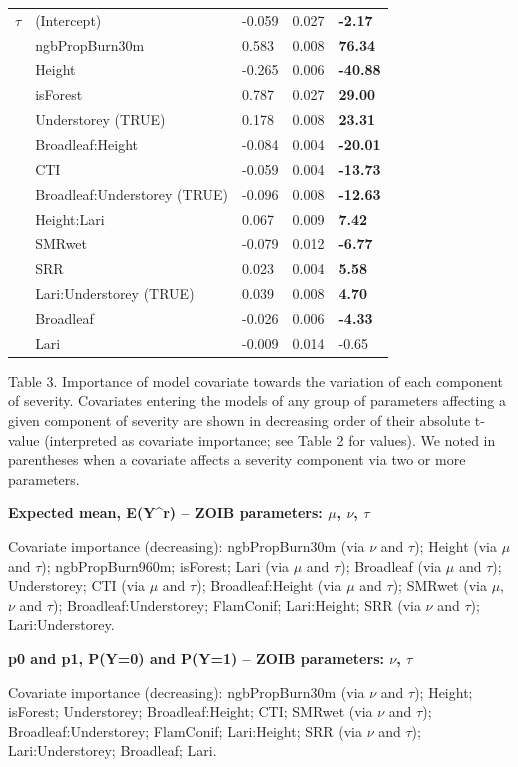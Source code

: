 \documentclass[
  numafflabel,
  authoryear,
  preprint]{elsarticle}
\begin{document}
\begin{longtable}[]{@{}lllll@{}}
\(\tau\) & (Intercept) & -0.059 & 0.027 & \textbf{-2.17} \\
& ngbPropBurn30m & 0.583 & 0.008 & \textbf{76.34} \\
& Height & -0.265 & 0.006 & \textbf{-40.88} \\
& isForest & 0.787 & 0.027 & \textbf{29.00} \\
& Understorey (TRUE) & 0.178 & 0.008 & \textbf{23.31} \\
& Broadleaf:Height & -0.084 & 0.004 & \textbf{-20.01} \\
& CTI & -0.059 & 0.004 & \textbf{-13.73} \\
& Broadleaf:Understorey (TRUE) & -0.096 & 0.008 & \textbf{-12.63} \\
& Height:Lari & 0.067 & 0.009 & \textbf{7.42} \\
& SMRwet & -0.079 & 0.012 & \textbf{-6.77} \\
& SRR & 0.023 & 0.004 & \textbf{5.58} \\
& Lari:Understorey (TRUE) & 0.039 & 0.008 & \textbf{4.70} \\
& Broadleaf & -0.026 & 0.006 & \textbf{-4.33} \\
& Lari & -0.009 & 0.014 & -0.65 \\
\end{longtable}

\newpage{}

Table 3. Importance of model covariate towards the variation of each
component of severity. Covariates entering the models of any group of
parameters affecting a given component of severity are shown in
decreasing order of their absolute t-value (interpreted as covariate
importance; see Table 2 for values). We noted in parentheses when a
covariate affects a severity component via two or more parameters.

\textbf{Expected mean, E(Y\^{}r) -- ZOIB parameters: \(\mu\), \(\nu\),
\(\tau\)}

Covariate importance (decreasing): ngbPropBurn30m (via \(\nu\) and
\(\tau\)); Height (via \(\mu\) and \(\tau\)); ngbPropBurn960m; isForest;
Lari (via \(\mu\) and \(\tau\)); Broadleaf (via \(\mu\) and \(\tau\));
Understorey; CTI (via \(\mu\) and \(\tau\)); Broadleaf:Height (via
\(\mu\) and \(\tau\)); SMRwet (via \(\mu\), \(\nu\) and \(\tau\));
Broadleaf:Understorey; FlamConif; Lari:Height; SRR (via \(\nu\) and
\(\tau\)); Lari:Understorey.

\textbf{p0 and p1, P(Y=0) and P(Y=1) -- ZOIB parameters: \(\nu\),
\(\tau\)}

Covariate importance (decreasing): ngbPropBurn30m (via \(\nu\) and
\(\tau\)); Height; isForest; Understorey; Broadleaf:Height; CTI; SMRwet
(via \(\nu\) and \(\tau\)); Broadleaf:Understorey; FlamConif;
Lari:Height; SRR (via \(\nu\) and \(\tau\)); Lari:Understorey;
Broadleaf; Lari.
\end{document}
